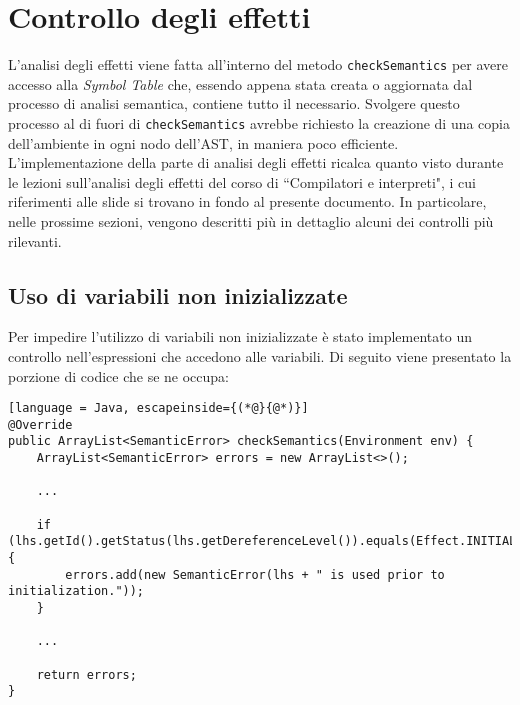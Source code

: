 \documentclass[../report.tex]{subfiles}
\begin{document}
\section{Controllo degli effetti}\label{s:controllo-effetti}
L'analisi degli effetti viene fatta all'interno del metodo \verb|checkSemantics| per avere accesso alla \textit{Symbol Table} che, essendo appena stata creata o aggiornata dal processo di analisi semantica, contiene tutto il necessario.
Svolgere questo processo al di fuori di \verb|checkSemantics| avrebbe richiesto la creazione di una copia dell'ambiente in ogni nodo dell'AST, in maniera poco efficiente.\\
\noindent
L'implementazione della parte di analisi degli effetti ricalca quanto visto durante le lezioni sull'analisi degli effetti del corso di ``Compilatori e interpreti", i cui riferimenti alle slide si trovano in fondo al presente documento.
In particolare, nelle prossime sezioni, vengono descritti più in dettaglio alcuni dei controlli più rilevanti.

\subsection{Uso di variabili non inizializzate}\label{s:uso-variabili-non-inizializzate}
Per impedire l'utilizzo di variabili non inizializzate è stato implementato un controllo nell'espressioni che accedono alle variabili.
Di seguito viene presentato la porzione di codice che se ne occupa:
\begin{lstlisting}[language = Java, escapeinside={(*@}{@*)}]
@Override
public ArrayList<SemanticError> checkSemantics(Environment env) {
    ArrayList<SemanticError> errors = new ArrayList<>();

    ...

    if (lhs.getId().getStatus(lhs.getDereferenceLevel()).equals(Effect.INITIALIZED)) {
        errors.add(new SemanticError(lhs + " is used prior to initialization."));
    }

    ...

    return errors;
}
\end{lstlisting}
\end{document}
